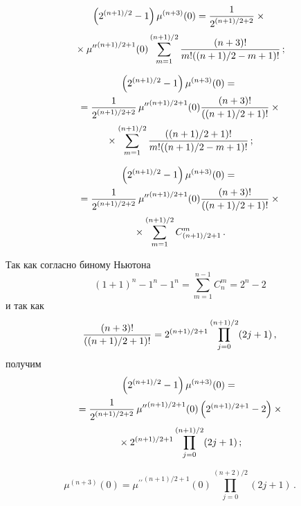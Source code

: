 \begin{multicols}{2}
{\begin{enumerate}[1.]
  \pagebreak
  
  \noindent
  \begin{multline*}
  \left( 2^{(n+1)/2}-1\right) \mu^{(n+3)}(0)=
  \displaystyle\frac{\displaystyle 1\mathstrut}{\displaystyle 2^{(n+1)/2+2}\mathstrut}\times{}\\
  {}\times 
{\mu^{\prime\prime}}^{(n+1)/2+1}(0)\sum\limits_{m=1}^{(n+1)/2} \displaystyle\frac{\displaystyle (n+3)!\mathstrut}{\displaystyle m!((n+1)/2-m+1)!\mathstrut}\,;
  \end{multline*}

\vspace*{-12pt}

\noindent
  \begin{multline*}
  \left( 2^{(n+1)/2}-1\right) \mu^{(n+3)}(0)= {}\\
  {}=\displaystyle\frac{\displaystyle 1\mathstrut}{\displaystyle 2^{(n+1)/2+2}\mathstrut}\, 
{\mu^{\prime\prime}}^{(n+1)/2+1}(0) \displaystyle\frac{\displaystyle (n+3)!\mathstrut}{\displaystyle ((n+1)/2+1)!\mathstrut} \times{}\\
{}\times
\sum\limits_{m=1}^{(n+1)/2} \displaystyle\frac{\displaystyle ((n+1)/2+1)!\mathstrut}{\displaystyle m!((n+1)/2-m+1)!\mathstrut}\,;
  \end{multline*}
  
  \vspace*{-12pt}
  
  \noindent
  \begin{multline*}
  \left( 2^{(n+1)/2}-1\right) \mu^{(n+3)}(0)= {}\\
  {}=\displaystyle\frac{\displaystyle 1\mathstrut}{\displaystyle 2^{(n+1)/2+2}\mathstrut}\, 
{\mu^{\prime\prime}}^{(n+1)/2+1}(0) \displaystyle\frac{\displaystyle (n+3)!\mathstrut}{\displaystyle ((n+1)/2+1)!\mathstrut} \times{}\\
{}\times
\sum\limits_{m=1}^{(n+1)/2} C^m_{(n+1)/2+1}\,.
  \end{multline*}
  
  Так как согласно биному Ньютона 
  $$
  (1+1)^n-1^n-1^n= \sum\limits_{m=1}^{n-1} C_n^m= 2^n-2
  $$ 
  и так как 
  $$
  \displaystyle\frac{\displaystyle (n+3)!\mathstrut}{\displaystyle ((n+1)/2+1)!\mathstrut}=2^{(n+1)/2+1}\prod\limits_{j=0}^{(n+1)/2}(2j+1)\,,
  $$
  получим
  \begin{multline*}
  \left( 2^{(n+1)/2}-1\right) \mu^{(n+3)}(0)={}\\
  {}= \displaystyle\frac{\displaystyle 1\mathstrut}{\displaystyle 2^{(n+1)/2+2}\mathstrut}\, 
{\mu^{\prime\prime}}^{(n+1)/2+1}(0) \left( 2^{(n+1)/2+1}-2\right)\times{}\\
{}\times  2^{(n+1)/2+1} 
\prod\limits_{j=0}^{(n+1)/2}(2j+1)\,;
  \end{multline*}
  
  \vspace*{-12pt}
  
  \noindent
  \begin{equation*}
  \mu^{(n+3)}(0) ={\mu^{\prime\prime}}^{(n+1)/2+1}(0) 
\prod\limits_{j=0}^{(n+2)/2}(2j+1)\,.
  \end{equation*}
  

\end{enumerate}}
\end{multicols}
